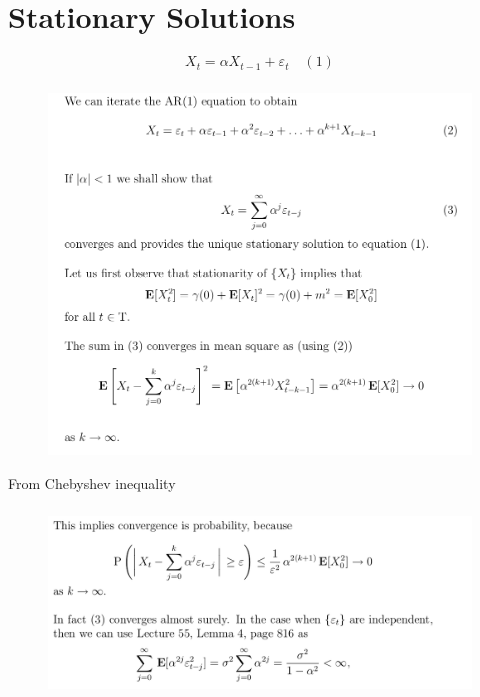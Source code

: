 \documentclass[c, dvipsnames, 8pt]{beamer}
\begin{document}
\section{Stationary Solutions}


\begin{frame}[shrink=5]

	$$X_t = \alpha X_{t-1} + \varepsilon_t   \quad (1)  $$ 
	
	
	\frametitle{\insertsection} 
	\begin{figure}
		\centering
		\includegraphics[width=1\linewidth]{screenshot023}
		\label{fig:screenshot001}
	\end{figure}
	
	
\end{frame}





\begin{frame}[shrink=5]
	
From Chebyshev inequality 
	
	\frametitle{\insertsection} 
	\begin{figure}
		\centering
		\includegraphics[width=1\linewidth]{screenshot024}
		\label{fig:screenshot001}
	\end{figure}
	
	
\end{frame}
\end{document}
